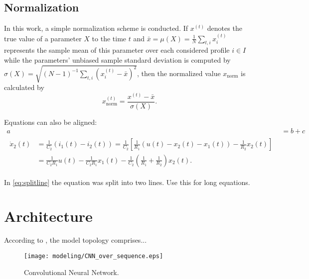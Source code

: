 \subsection{Normalization}
\label{subsec:normalization}
In this work, a simple normalization scheme is conducted.
If $x^{(t)}$ denotes the true value of a parameter $X$ to the time $t$ and $\bar{x} = \mu(X) = \frac{1}{N}\sum\nolimits_{t, i} x^{(t)}_i$ represents the sample mean of this parameter over each considered profile $i\in I$ while the parameters' unbiased sample standard deviation is computed by $\sigma(X)=\sqrt{(N-1)^{-1}\sum\nolimits_{t, i} (x^{(t)}_i - \bar{x})^2}$, then the normalized value $x_\text{norm}$ is calculated by  
\begin{equation}
	x_\text{norm}^{(t)} = \frac{x^{(t)}-\bar{x}}{\sigma(X)}.
\end{equation}

Equations can also be aligned:
\begin{align}
    a&=b+c\\
    \begin{split}
        \dot{x}_2(t)&= \frac{1}{C_2} \left( i_1(t)-i_2(t)\right)= \frac{1}{C_2} \left[ \frac{1}{R_1} \left(u(t)-x_2(t)-x_1(t) \right)-\frac{1}{R_2} x_2(t)\right]\\
        &= \frac{1}{C_2 R_1} u(t)-\frac{1}{C_2 R_1} x_1(t) - \frac{1}{C_2} \left( \frac{1}{R_1}+\frac{1}{R_2}\right) x_2(t). 
        \label{eq:splitline}
    \end{split}
\end{align}

In \eqref{eq:splitline} the equation was split into two lines. Use this for long equations.

\section{Architecture}
\label{sec:architecture}
According to , the model topology comprises...

\begin{figure}[htb]
	\centering
    \texttt{[image: modeling/CNN\_over\_sequence.eps]}
    \caption{Convolutional Neural Network.}
	\label{fig:cnn}
\end{figure}


